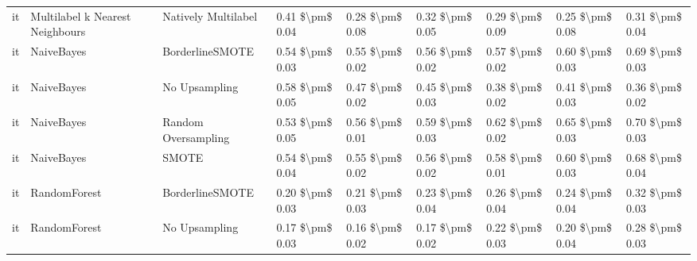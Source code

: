 \begin{tabular}{lllllllll}
      it & Multilabel k Nearest Neighbours &           Natively Multilabel &     0.41 \$\textbackslash pm\$ 0.04 &           0.28 \$\textbackslash pm\$ 0.08 &       0.32 \$\textbackslash pm\$ 0.05 &        0.29 \$\textbackslash pm\$ 0.09 &                         0.25 \$\textbackslash pm\$ 0.08 &     0.31 \$\textbackslash pm\$ 0.04 \\
      it &                      NaiveBayes &               BorderlineSMOTE &     0.54 \$\textbackslash pm\$ 0.03 &           0.55 \$\textbackslash pm\$ 0.02 &       0.56 \$\textbackslash pm\$ 0.02 &        0.57 \$\textbackslash pm\$ 0.02 &                         0.60 \$\textbackslash pm\$ 0.03 &     0.69 \$\textbackslash pm\$ 0.03 \\
      it &                      NaiveBayes &                 No Upsampling &     0.58 \$\textbackslash pm\$ 0.05 &           0.47 \$\textbackslash pm\$ 0.02 &       0.45 \$\textbackslash pm\$ 0.03 &        0.38 \$\textbackslash pm\$ 0.02 &                         0.41 \$\textbackslash pm\$ 0.03 &     0.36 \$\textbackslash pm\$ 0.02 \\
      it &                      NaiveBayes &           Random Oversampling &     0.53 \$\textbackslash pm\$ 0.05 &           0.56 \$\textbackslash pm\$ 0.01 &       0.59 \$\textbackslash pm\$ 0.03 &        0.62 \$\textbackslash pm\$ 0.02 &                         0.65 \$\textbackslash pm\$ 0.03 &     0.70 \$\textbackslash pm\$ 0.03 \\
      it &                      NaiveBayes &                         SMOTE &     0.54 \$\textbackslash pm\$ 0.04 &           0.55 \$\textbackslash pm\$ 0.02 &       0.56 \$\textbackslash pm\$ 0.02 &        0.58 \$\textbackslash pm\$ 0.01 &                         0.60 \$\textbackslash pm\$ 0.03 &     0.68 \$\textbackslash pm\$ 0.04 \\
      it &                    RandomForest &               BorderlineSMOTE &     0.20 \$\textbackslash pm\$ 0.03 &           0.21 \$\textbackslash pm\$ 0.03 &       0.23 \$\textbackslash pm\$ 0.04 &        0.26 \$\textbackslash pm\$ 0.04 &                         0.24 \$\textbackslash pm\$ 0.04 &     0.32 \$\textbackslash pm\$ 0.03 \\
      it &                    RandomForest &                 No Upsampling &     0.17 \$\textbackslash pm\$ 0.03 &           0.16 \$\textbackslash pm\$ 0.02 &       0.17 \$\textbackslash pm\$ 0.02 &        0.22 \$\textbackslash pm\$ 0.03 &                         0.20 \$\textbackslash pm\$ 0.04 &     0.28 \$\textbackslash pm\$ 0.03 \\

\end{tabular}
